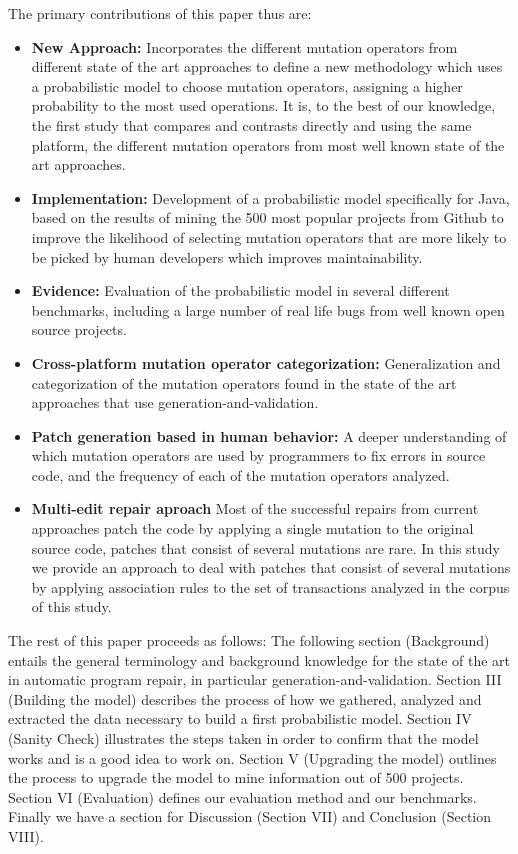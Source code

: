 \documentclass[conference]{IEEEtran}
\begin{document}
The primary contributions of this paper thus are:
\begin{itemize}
  \item \textbf{New Approach:} Incorporates the different mutation operators from different state of the art approaches to define a new methodology which uses a probabilistic model to choose mutation operators, assigning a higher probability to the most used operations. It is, to the best of our knowledge, the first study that compares and contrasts directly and using the same platform, the different mutation operators from most well known state of the art approaches. 
  \item \textbf{Implementation:} Development of a probabilistic model specifically for Java, based on the results of mining the 500 most popular projects from Github to improve the likelihood of selecting mutation operators that are more likely to be picked by human developers which improves maintainability.
  \item \textbf{Evidence:} Evaluation of the probabilistic model in several different benchmarks, including a large number of real life bugs from well known open source projects.
  \item \textbf{Cross-platform mutation operator categorization:} Generalization and categorization of the mutation operators found in the state of the art approaches that use generation-and-validation.
  \item \textbf{Patch generation based in human behavior:} A deeper understanding of which mutation operators are used by programmers to fix errors in source code, and the frequency of each of the mutation operators analyzed.
  \item \textbf{Multi-edit repair aproach} Most of the successful repairs from current approaches patch the code by applying a single mutation to the original source code, patches that consist of several mutations are rare. In this study we provide an approach to deal with patches that consist of several mutations by applying association rules to the set of transactions analyzed in the corpus of this study.  
\end{itemize}

The rest of this paper proceeds as follows:
The following section (Background) entails the general terminology and background knowledge for the state of the art in automatic program repair, in particular generation-and-validation. Section III (Building the model) describes the process of how we gathered, analyzed and extracted the data necessary to build a first probabilistic model. Section IV (Sanity Check) illustrates the steps taken in order to confirm that the model works and is a good idea to work on. Section V (Upgrading the model) outlines the process to upgrade the model to mine information out of 500 projects. Section VI (Evaluation) defines our evaluation method and our benchmarks. Finally we have a section for Discussion (Section VII) and Conclusion (Section VIII).
\end{document}
